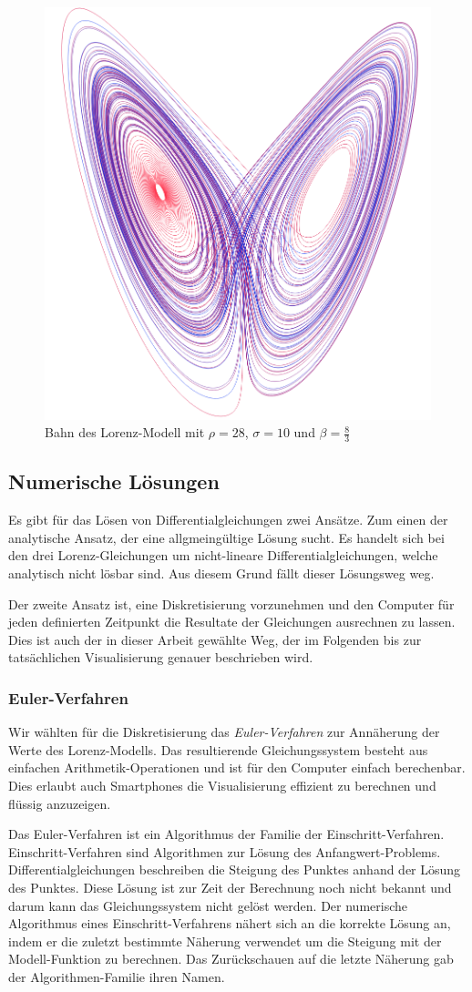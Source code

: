 \begin{figure}
	\centering
	\includegraphics[width=0.3\linewidth]{lorenz/assets/lorenz-modell/lorenz-modell}
	\caption{Bahn des Lorenz-Modell mit $\rho = 28$, $\sigma = 10$ und $\beta = \frac{8}{3}$}
	\label{fig:lorenz-modell}
\end{figure}


\subsection{Numerische Lösungen}
Es gibt für das Lösen von Differentialgleichungen zwei Ansätze. Zum einen der analytische Ansatz, der eine allgmeingültige Lösung sucht. Es handelt sich bei den drei Lorenz-Gleichungen um nicht-lineare Differentialgleichungen, welche analytisch nicht lösbar sind. Aus diesem Grund fällt dieser Lösungsweg weg. 

Der zweite Ansatz ist, eine Diskretisierung vorzunehmen und den Computer für jeden definierten Zeitpunkt die Resultate der Gleichungen ausrechnen zu lassen. Dies ist auch der in dieser Arbeit gewählte Weg, der im Folgenden bis zur tatsächlichen Visualisierung genauer beschrieben wird. 

\subsubsection{Euler-Verfahren}

Wir wählten für die Diskretisierung das \textit{Euler-Verfahren} zur Annäherung der Werte des Lorenz-Modells. Das resultierende Gleichungssystem besteht aus einfachen Arithmetik-Operationen und ist für den Computer einfach berechenbar. Dies erlaubt auch Smartphones die Visualisierung effizient zu berechnen und flüssig anzuzeigen.

Das Euler-Verfahren ist ein Algorithmus der Familie der Einschritt-Verfahren. Einschritt-Verfahren sind Algorithmen zur Lösung des Anfangwert-Problems. Differentialgleichungen beschreiben die Steigung des Punktes anhand der Lösung des Punktes. Diese Lösung ist zur Zeit der Berechnung noch nicht bekannt und darum kann das Gleichungssystem nicht gelöst werden. Der numerische Algorithmus eines Einschritt-Verfahrens nähert sich an die korrekte Lösung an, indem er die zuletzt bestimmte Näherung verwendet um die Steigung mit der Modell-Funktion zu berechnen. Das Zurückschauen auf die letzte Näherung gab der Algorithmen-Familie ihren Namen.

